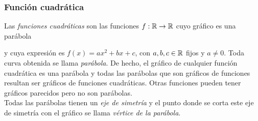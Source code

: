 \documentclass[../Teoría.root.tex]{subfiles}
\begin{document}
\subsubsection{Función cuadrática}
Las \textit{funciones cuadráticas} son las funciones \(f: \mathbb{R} \rightarrow \mathbb{R}\) cuyo gráfico es una parábola
\begin{center}
\end{center}
y cuya expresión es \(f(x)=ax^2+bx+c\), con \(a,b,c\in\mathbb{R}\) fijos y \(a\neq0\).
Toda curva obtenida se llama \textit{parábola}.
De hecho, el gráfico de cualquier función cuadrática es una parábola y todas las parábolas que son gráficos de funciones resultan ser gráficos de funciones cuadráticas.
Otras funciones pueden tener gráficos parecidos pero no son parábolas.\\
Todas las parábolas tienen un \textit{eje de simetría} y el punto donde se corta este eje de simetría con el gráfico se llama \textit{vértice de la parábola}.
\end{document}
